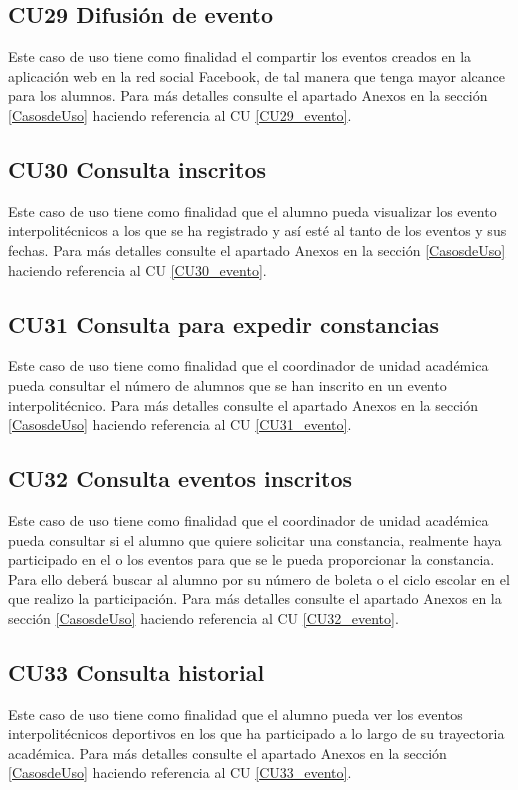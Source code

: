 		\subsection{CU29 Difusión de evento}
		\noindent Este caso de uso tiene como finalidad el compartir los eventos creados en la aplicación web en la red social Facebook, de tal manera que tenga mayor alcance para los alumnos. Para más detalles consulte el apartado Anexos en la sección \ref{CasosdeUso} haciendo referencia al CU \ref{CU29_evento}.\\
		
		\subsection{CU30 Consulta inscritos}
		\noindent Este caso de uso tiene como finalidad que el alumno pueda visualizar los evento interpolitécnicos a los que se ha registrado y así esté al tanto de los eventos y sus fechas. Para más detalles consulte el apartado Anexos en la sección \ref{CasosdeUso} haciendo referencia al CU \ref{CU30_evento}.\\
		
		\subsection{CU31 Consulta para expedir constancias}
		\noindent Este caso de uso tiene como finalidad que el coordinador de unidad académica pueda consultar el número de alumnos que se han inscrito en un evento interpolitécnico. Para más detalles consulte el apartado Anexos en la sección \ref{CasosdeUso} haciendo referencia al CU \ref{CU31_evento}.\\
		
		\subsection{CU32 Consulta eventos inscritos}
		\noindent Este caso de uso tiene como finalidad que el coordinador de unidad académica pueda consultar si el alumno que quiere solicitar una constancia, realmente haya participado en el o los eventos para que se le pueda proporcionar la constancia. Para ello deberá buscar al alumno por su número de boleta o el ciclo escolar en el que realizo la participación. Para más detalles consulte el apartado Anexos en la sección \ref{CasosdeUso} haciendo referencia al CU \ref{CU32_evento}.\\
		
		\subsection{CU33 Consulta historial}
		\noindent Este caso de uso tiene como finalidad que el alumno pueda ver los eventos interpolitécnicos deportivos en los que ha participado a lo largo de su trayectoria académica. Para más detalles consulte el apartado Anexos en la sección \ref{CasosdeUso} haciendo referencia al CU \ref{CU33_evento}.\\
		

